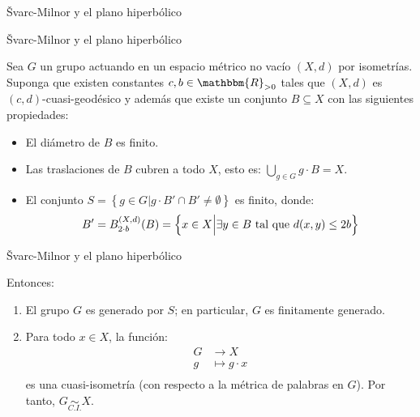 \documentclass[xcolor=dvipsnames]{beamer}
\theoremstyle{largebreak}
\newcommand{\bbm}[1]{\ensuremath{\mathbbm{#1}}}
\newcommand{\qisom}{\ensuremath{\underset{C.I.}{\sim}}}
\begin{document}
\begin{frame}
    \begin{center}
        \Large Švarc-Milnor y el plano hiperbólico
    \end{center}
\end{frame}

\begin{frame}{Švarc-Milnor y el plano hiperbólico}
    \begin{lema}
        Sea $G$ un grupo actuando en un espacio métrico no vacío $(X,d)$ por isometrías. Suponga que existen constantes $c,b\in\bbm{R}_{>0}$ tales que $(X,d)$ es $(c,d)$-cuasi-geodésico y además que existe un conjunto $B\subseteq X$ con las siguientes propiedades:
        \begin{itemize}
            \item El diámetro de $B$ es finito.
            \item Las traslaciones de $B$ cubren a todo $X$, esto es: $\bigcup_{g\in G}g\cdot B=X$.
            \item El conjunto $S=\left\{g\in G\Big|g\cdot B'\cap B'\neq\emptyset \right\}$ es finito, donde:
            \begin{equation*}
                B'=B_{2\cdot b}^{(X,d)}(B)=\left\{x\in X\Big|\exists y\in B\textup{ tal que }d(x,y)\leq 2b \right\}
            \end{equation*}
        \end{itemize}
    \end{lema}
\end{frame}

\begin{frame}{Švarc-Milnor y el plano hiperbólico}
    \begin{lema}
        Entonces:
        \begin{enumerate}[label = \textit{(\arabic*)}]
            \item El grupo $G$ es generado por $S$; en particular, $G$ es finitamente generado.
            \item Para todo $x\in X$, la función:
            \begin{equation*}
                \begin{split}
                    G&\rightarrow X\\
                    g&\mapsto g\cdot x\\
                \end{split}
            \end{equation*}
            es una cuasi-isometría (con respecto a la métrica de palabras en $G$). Por tanto, $G\qisom X$.
        \end{enumerate}
    \end{lema}
\end{frame}
\end{document}
